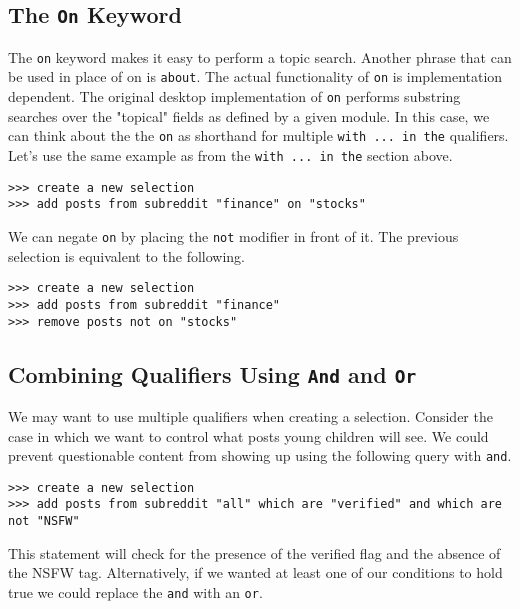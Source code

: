 \subsection{The \texttt{On} Keyword}
The \texttt{on} keyword makes it easy to perform a topic search. Another phrase that can be used in place of on is \texttt{about}. The actual functionality of \texttt{on} is implementation dependent. The original desktop implementation of \texttt{on} performs substring searches over the "topical" fields as defined by a given module. In this case, we can think about the the \texttt{on} as shorthand for multiple \texttt{with ... in the} qualifiers. Let’s use the same example as from the  \texttt{with ... in the} section above.
\newline\begin{minipage}{\linewidth}\begin{lstlisting}
>>> create a new selection
>>> add posts from subreddit "finance" on "stocks"
\end{lstlisting}\end{minipage}
We can negate \texttt{on} by placing the \texttt{not} modifier in front of it. The previous selection is equivalent to the following.
\newline\begin{minipage}{\linewidth}\begin{lstlisting}
>>> create a new selection
>>> add posts from subreddit "finance"
>>> remove posts not on "stocks"
\end{lstlisting}\end{minipage}
\subsection{Combining Qualifiers Using \texttt{And} and \texttt{Or}}
We may want to use multiple qualifiers when creating a selection. Consider the case in which we want to control what posts young children will see. We could prevent questionable content from showing up using the following query with \texttt{and}.
\newline\begin{minipage}{\linewidth}\begin{lstlisting}
>>> create a new selection
>>> add posts from subreddit "all" which are "verified" and which are not "NSFW"
\end{lstlisting}\end{minipage}
This statement will check for the presence of the verified flag and the absence of the NSFW tag. Alternatively, if we wanted at least one of our conditions to hold true we could replace the \texttt{and} with an \texttt{or}.

